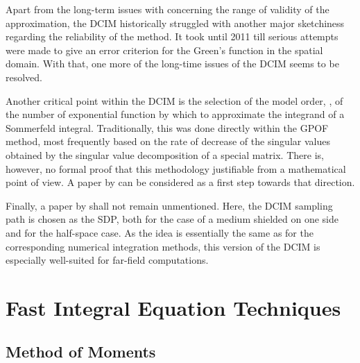 Apart from the long-term issues with concerning the range of validity of the 
approximation, the \ac{DCIM} historically struggled with another major
sketchiness regarding the reliability of the method.
It took until 2011 \cite{Karabulut2011,Karabulut2011b} till serious attempts
were made to give an error criterion for the Green's function in the
spatial domain.
With that, one more of the long-time issues of the \ac{DCIM} seems to be
resolved.

Another critical point within the \ac{DCIM} is the selection of the model order,
\ie, of the number of exponential function by which to approximate the
integrand of a Sommerfeld integral.
Traditionally, this was done directly within the \ac{GPOF} method, most
frequently based on the rate of decrease of the singular values obtained by
the singular value decomposition of a special matrix.
There is, however, no formal proof that this methodology justifiable from a
mathematical point of view.
A paper by \textcite{Karabulut2011a} can be considered as a first step
towards that direction.

Finally, a paper by \textcite{Chen2011} shall not remain unmentioned.
Here, the \ac{DCIM} sampling path is chosen as the \ac{SDP}, both for the case
of a medium shielded on one side and for the half-space case.
As the idea is essentially the same as for the corresponding numerical
integration methods, this version of the \ac{DCIM} is especially well-suited
for far-field computations.







\section{Fast Integral Equation Techniques}
\label{sec:integral_equation_techniques}



\subsection{Method of Moments}

